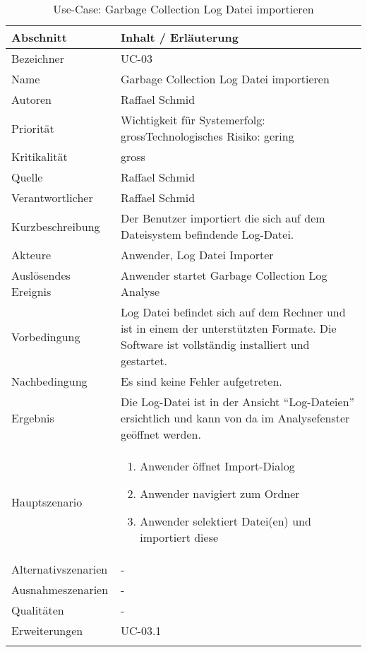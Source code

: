 \begin{longtable}{|p{4cm}|p{10.5cm}|}
\hline
   \textbf{Abschnitt} & \textbf{Inhalt / Erläuterung} \\\hline
   Bezeichner & UC-03\\\hline
   Name & Garbage Collection Log Datei importieren\\\hline
   Autoren & Raffael Schmid\\\hline
   Priorität & Wichtigkeit für Systemerfolg: gross\newline Technologisches Risiko: gering\\\hline
   Kritikalität & gross\\\hline
   Quelle & Raffael Schmid\\\hline
   Verantwortlicher & Raffael Schmid\\\hline
   Kurzbeschreibung & Der Benutzer importiert die sich auf dem Dateisystem befindende Log-Datei.\\\hline
   Akteure & Anwender, Log Datei Importer\\\hline
   Auslösendes Ereignis & Anwender startet Garbage Collection Log Analyse\\\hline
   Vorbedingung & Log Datei befindet sich auf dem Rechner und ist in einem der unterstützten Formate. Die Software ist vollständig installiert und gestartet.\\\hline
   Nachbedingung & Es sind keine Fehler aufgetreten. \\\hline
   Ergebnis & Die Log-Datei ist in der Ansicht ``Log-Dateien'' ersichtlich und kann von da im Analysefenster geöffnet werden.\\\hline
   Hauptszenario & 
	\begin{enumerate}
		\item Anwender öffnet Import-Dialog
		\item Anwender navigiert zum Ordner
		\item Anwender selektiert Datei(en) und importiert diese
	\end{enumerate}
	\\\hline
   Alternativszenarien & -\\\hline
   Ausnahmeszenarien & -\\\hline
   Qualitäten & -\\\hline
   Erweiterungen & UC-03.1\\\hline
\caption{Use-Case: Garbage Collection Log Datei importieren}
\end{longtable}


